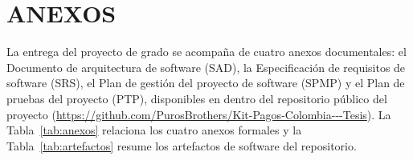 \section{ANEXOS}
\label{sec:anexos}

La entrega del proyecto de grado se acompaña de cuatro anexos documentales: el Documento de arquitectura de software (SAD), la Especificación de requisitos de software (SRS), el Plan de gestión del proyecto de software (SPMP) y el Plan de pruebas del proyecto (PTP), disponibles en  dentro del repositorio público del proyecto (\url{https://github.com/PurosBrothers/Kit-Pagos-Colombia---Tesis}). La Tabla~\ref{tab:anexos} relaciona los cuatro anexos formales y la Tabla~\ref{tab:artefactos} resume los artefactos de software del repositorio.

\newcommand{\letraanexo}[1]{\ifcase#1\or A\or B\or C\or D\or E\or F\or G\or H\fi}
\renewcommand{\theanexo}{\letraanexo{\value{anexo}}}
\newcommand{\anexo}[1]{\refstepcounter{anexo}\label{#1}\theanexo}
\renewcommand{\theartefacto}{\arabic{artefacto}}
\newcommand{\artefacto}[1]{\refstepcounter{artefacto}\label{#1}\theartefacto}

